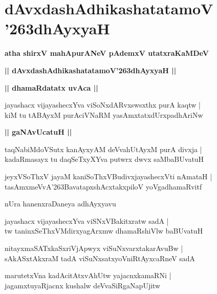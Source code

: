 \documentclass[twoside,12pt,openright]{book}
\def\S{\char'263}
\newcounter{shloka}[chapter]
\def\uvaca#1{\centerline{{\large\textbf{#1}}}}
\begin{document}
\chapter{dAvxdashAdhikashatatamoV \S dhAyxyaH}

\begin{center}
{\LARGE\bfseries atha shirxV mahApurANeV pAdemxV utatxraKaMDeV}
\end{center}

\begin{center}
{\LARGE\bfseries || dAvxdashAdhikashatatamoV\S dhAyxyaH || }
\end{center}

\uvaca{|| dhamaRdatatx uvAca ||}

\begin{shloka}%
jayashacx vijayashecxYva viSoNxdARvxswsxthx purA kaqtw |\\
kiM tu tABAyxM purAciVNaRM yasAmxtatxdUrxpadhAriNw 
\end{shloka}

\uvaca{|| gaNAvUcatuH ||}

\begin{shloka}%
taqNabiMdoVSutx kanAyxyAM deVvahUtAyxM purA divxja |\\
kadaRmasayx tu daqSeTxyXYva putwrx dwvx saMbaBUvatuH
\end{shloka}

\begin{shloka}%
jeyxVSoThxV jayaM kaniSoThxVBudivxjayashecxVti nAmataH |\\
tasAmxmeVvA\S BavatapxshAcxtakxpiloV yoVgadhamaRvitf
\end{shloka}

\begin{center}
nUra hanenxraDaneya adhAyxyavu
\end{center}

\begin{shloka}%
jayashacx vijayashecxYva viSNxVBakitxratw sadA |\\
tw taninxSeThxVMdirxyagArxmw dhamaRshiVlw baBUvatuH 
\end{shloka}

\begin{shloka}%
nitayxmaSATxkaSxriVjApwyx viSuNxvarxtakarAvuBw |\\
sAkASxtAkxraM tadA viSuNxsatxyoVniRtAyxcaRneV sadA 
\end{shloka}

\begin{shloka}%
marutetxVna kadAcitAtxvAhUtw yajacnxkamaRNi |\\
jagamxtuyaRjacnx kushalw deVvaSiRgaNapUjitw 
\end{shloka}
\end{document}
